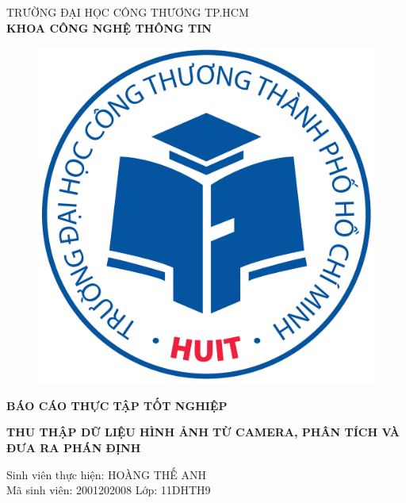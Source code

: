 	\begin{center}
		\fontsize{16}{20}\selectfont
		\textsc{TRƯỜNG ĐẠI HỌC CÔNG THƯƠNG TP.HCM\\ 
			\textbf{KHOA CÔNG NGHỆ THÔNG TIN}}
		
		\vspace{0.8cm}
		\begin{figure}[htp]
			\begin{center}
				\includegraphics[scale=0.04]{logo.png}
			\end{center}
		\end{figure}
		\vspace{3cm}
		\fontsize{20}{20}\selectfont\textbf{BÁO CÁO THỰC TẬP TỐT NGHIỆP\\}
		
		\vspace{1cm}
		\fontsize{18}{20}\selectfont\textbf{THU THẬP DỮ LIỆU HÌNH ẢNH TỪ CAMERA, PHÂN TÍCH VÀ ĐƯA RA PHÁN ĐỊNH}
	\end{center}
	\vspace{6cm}
	\begin{center}
		\fontsize{14}{20}\selectfont\textit{}{Sinh viên thực hiện: HOÀNG THẾ ANH}\\
		\fontsize{14}{20}\selectfont\textit{}{Mã sinh viên: 2001202008 Lớp: 11DHTH9}

	\end{center}
	\pagebreak